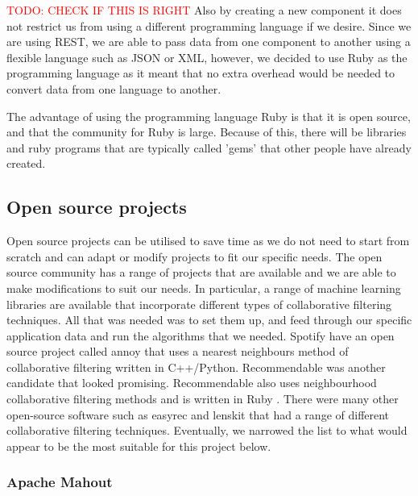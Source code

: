 \textcolor{red}{TODO: CHECK IF THIS IS RIGHT}
Also by creating a new component it does not restrict us from using a different programming language if we desire. Since we are using REST, we are able to pass data from one component to another using a flexible language such as JSON or XML, however, we decided to use Ruby as the programming language as it meant that no extra overhead would be needed to convert data from one language to another. 

The advantage of using the programming language Ruby is that it is open source, and that the community for Ruby is large. Because of this, there will be libraries and ruby programs that are typically called 'gems' that other people have already created. 

\subsection{Open source projects}

Open source projects can be utilised to save time as we do not need to start from scratch and can adapt or modify projects to fit our specific needs. The open source community has a range of projects that are available and we are able to make modifications to suit our needs. In particular, a range of machine learning libraries are available that incorporate different types of collaborative filtering techniques. All that was needed was to set them up, and feed through our specific application data and run the algorithms that we needed. Spotify have an open source project called annoy \cite{annoy} that uses a nearest neighbours method of collaborative filtering written in C++/Python. Recommendable was another candidate that looked promising. Recommendable also uses neighbourhood collaborative filtering methods and is written in Ruby \cite{recommendable}. There were many other open-source software such as easyrec \cite{easyrec} and lenskit \cite{lenskit} that had a range of different collaborative filtering techniques. Eventually, we narrowed the list to what would appear to be the most suitable for this project below. 
\subsubsection{Apache Mahout}

